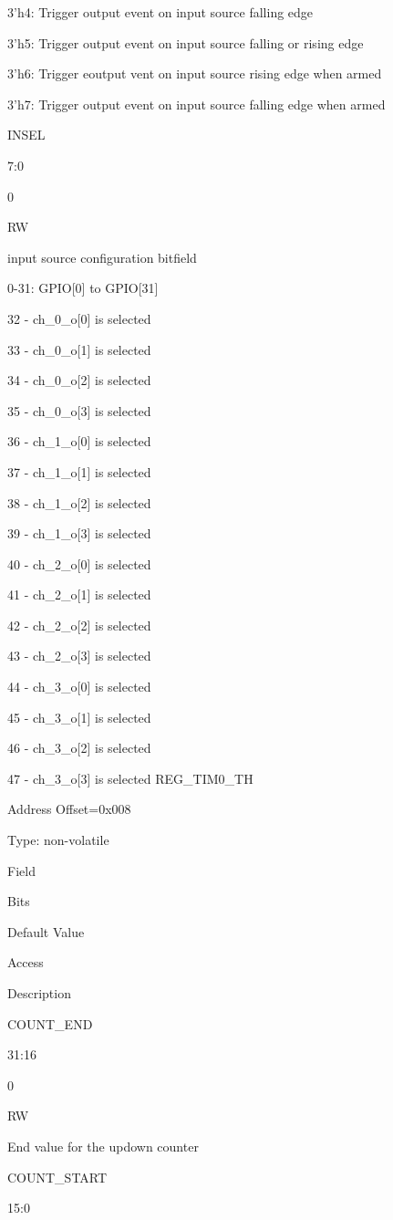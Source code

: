 3’h4: Trigger output event on input source falling edge

3’h5: Trigger output event on input source falling or rising edge

3’h6: Trigger eoutput vent on input source rising edge when armed

3’h7: Trigger output event on input source falling edge when armed

INSEL
	

7:0
	

0
	

RW
	

input source configuration bitfield

0-31: GPIO[0] to GPIO[31]

32 - ch_0_o[0] is selected

33 - ch_0_o[1] is selected

34 - ch_0_o[2] is selected

35 - ch_0_o[3] is selected

36 - ch_1_o[0] is selected

37 - ch_1_o[1] is selected

38 - ch_1_o[2] is selected

39 - ch_1_o[3] is selected

40 - ch_2_o[0] is selected

41 - ch_2_o[1] is selected

42 - ch_2_o[2] is selected

43 - ch_2_o[3] is selected

44 - ch_3_o[0] is selected

45 - ch_3_o[1] is selected

46 - ch_3_o[2] is selected

47 - ch_3_o[3] is selected
REG_TIM0_TH

    Address Offset=0x008

    Type: non-volatile

Field
	

Bits
	

Default Value
	

Access
	

Description

COUNT_END
	

31:16
	

0
	

RW
	

End value for the updown counter

COUNT_START
	

15:0
	

